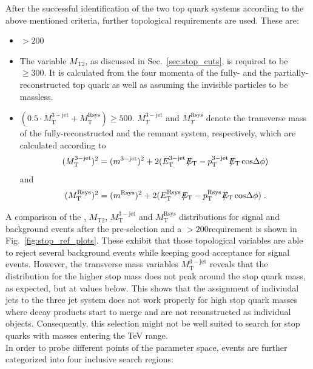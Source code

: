 After the successful identification of the two top quark systems according to the above mentioned criteria, further topological requirements are used. These are:
\begin{itemize}
 \item \met $> 200$\gev
 \item The variable $M_\mathrm{T2}$, as discussed in Sec.~\ref{sec:stop_cuts}, is required to be $\ge 300$\gev. It is calculated from the four momenta of the fully- and the partially-reconstructed top quark as well as \met assuming the invisible particles to be massless. 
 \item $(0.5 \cdot M_\mathrm{T}^\mathrm{3-jet} + M_\mathrm{T}^\mathrm{Rsys}) \ge 500$\gev. $ M_{T}^\mathrm{3-jet}$ and $M_{T}^\mathrm{Rsys}$ denote the transverse mass of the fully-reconstructed and the remnant system, respectively, which are calculated according to
\begin{equation*}
( M_\mathrm{T}^\mathrm{3-jet})^2 = (m^{3-\mathrm{jet}})^2 + 2(E_\mathrm{T}^\mathrm{3-jet} \, \slash\mkern-12mu{E}_{\text{T}} - p_\mathrm{T}^\mathrm{3-jet} \, \slash\mkern-12mu{E}_{\text{T}} \, \mathrm{cos} \Delta \phi)
\end{equation*} 
and 
\begin{equation*}
( M_\mathrm{T}^\mathrm{Rsys})^2 = (m^\mathrm{Rsys})^2 + 2(E_\mathrm{T}^\mathrm{Rsys} \, \slash\mkern-12mu{E}_{\text{T}} - p_\mathrm{T}^\mathrm{Rsys} \, \slash\mkern-12mu{E}_{\text{T}} \, \mathrm{cos} \Delta \phi) \; .
\end{equation*} 
\end{itemize}
A comparison of the \met, $M_\mathrm{T2}$, $M_\mathrm{T}^\mathrm{3-jet}$ and $M_\mathrm{T}^\mathrm{Rsys}$ distributions for signal and background events after the pre-selection and a \met$ > 200$\gev requirement is shown in Fig.~\ref{fig:stop_ref_plots}. These exhibit that those topological variables are able to reject several background events while keeping good acceptance for signal events. However, the transverse mass variables $M_\mathrm{T}^\mathrm{3-jet}$ reveals that the distribution for the higher stop mass does not peak around the stop quark mass, as expected, but at values below. This shows that the assignment of indiviudal jets to the three jet system does not work properly for high stop quark masses where decay products start to merge and are not reconstructed as individual objects. Consequently, this selection might not be well suited to search for stop quarks with masses entering the TeV range.   \\
In order to probe different points of the parameter space, events are further categorized into four inclusive search regions:
